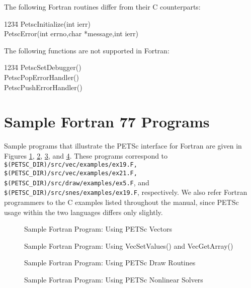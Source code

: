 The following Fortran routines differ from their C counterparts:
\begin{tabbing}
1234\= \kill
\> PetscInitialize(int ierr)\\
\> PetscError(int errno,char *message,int ierr)\\
\end{tabbing}
The following functions are not supported in Fortran:
\begin{tabbing}
1234\= \kill
\> PetscSetDebugger()\\
\> PetscPopErrorHandler()\\
\> PetscPushErrorHandler()\\
\end{tabbing}

\section{Sample Fortran 77 Programs}
\label{sec:fortran-examples}

Sample programs that illustrate the PETSc interface for Fortran
are given in Figures \ref{fig:vec-Fortran}, \ref{fig:vec2-Fortran}, 
\ref{fig:draw-Fortran}, and \ref{fig:SNES-Fortran}.  These programs
correspond to
{\tt \$(PETSC\_DIR)/src/vec/examples/ex19.F, 
\$(PETSC\_DIR)/src/vec/examples/ex21.F, 
\$(PETSC\_DIR)/src/draw/examples/ex5.F}, and 
{\tt \$(PETSC\_DIR)/src/snes/examples/ex19.F}, respectively.  We also
refer Fortran programmers to the C examples listed throughout the manual,
since PETSc usage within the two languages differs only slightly.

\begin{figure}[H]
{\small
{}
}
\caption{Sample Fortran Program:  Using PETSc Vectors}
\label{fig:vec-Fortran}
\end{figure}

\begin{figure}[H]
{\small
{}
}
\caption{Sample Fortran Program:  Using VecSetValues() and VecGetArray()}
\label{fig:vec2-Fortran}
\end{figure}

\begin{figure}[H]
{\small
{}
}
\caption{Sample Fortran Program:  Using PETSc Draw Routines}
\label{fig:draw-Fortran}
\end{figure}

\begin{figure}[H]
{\small
{}
}
\caption{Sample Fortran Program:  Using PETSc Nonlinear Solvers}
\label{fig:SNES-Fortran}
\end{figure}

